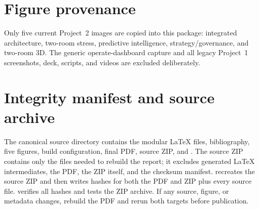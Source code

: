 \section{Figure provenance}
Only five current Project~2 images are copied into this package: integrated architecture, two-room stress, predictive intelligence, strategy/governance, and two-room 3D. The generic operate-dashboard capture and all legacy Project~1 screenshots, deck, scripts, and videos are excluded deliberately.

\section{Integrity manifest and source archive}
The canonical source directory contains the modular LaTeX files, bibliography, five figures, build configuration, final PDF, source ZIP, and . The source ZIP contains only the files needed to rebuild the report; it excludes generated LaTeX intermediates, the PDF, the ZIP itself, and the checksum manifest.  recreates the source ZIP and then writes hashes for both the PDF and ZIP plus every source file.  verifies all hashes and tests the ZIP archive. If any source, figure, or metadata changes, rebuild the PDF and rerun both targets before publication.
